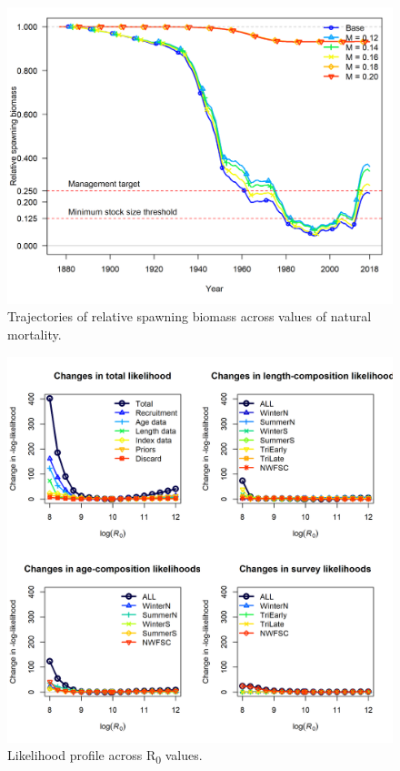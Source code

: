 \documentclass[12pt,]{article}
\begin{document}
\FloatBarrier

\begin{figure}
\centering
\includegraphics{Figures/m_trajectories.png}
\caption{Trajectories of relative spawning biomass across values of
natural mortality. \label{fig:m_trajectory}}
\end{figure}

\FloatBarrier

\begin{figure}
\centering
\includegraphics{Figures/piner_panel_R0.png}
\caption{Likelihood profile across R\textsubscript{0} values.
\label{fig:piner_R0}}
\end{figure}
\end{document}
